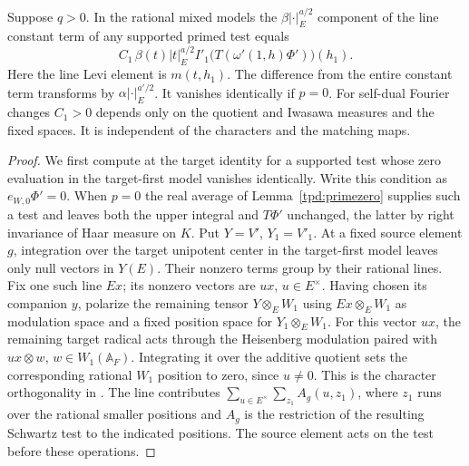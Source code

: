 \begin{proposition}
\label{tpd:unfold}
Suppose \(q>0\). In the rational mixed models the
\(\beta|\cdot|_E^{a/2}\) component of the line constant term of
any supported primed test equals
\[
 C_1\,\beta(t)|t|_E^{a/2}
 I'_1\bigl(T(\omega'(1,h)\Phi')\bigr)(h_1).
\]
Here the line Levi element is \(m(t,h_1)\). The difference from
the entire constant term transforms by \(\alpha|\cdot|_E^{a'/2}\).
It vanishes identically if \(p=0\).
For self-dual Fourier changes \(C_1>0\) depends only on the quotient
and Iwasawa measures and the fixed spaces. It is independent of the
characters and the matching maps.
\end{proposition}
\begin{proof}
We first compute at the target identity for a supported test
whose zero evaluation in the target-first model vanishes identically.
Write this condition as \(e_{W,0}\Phi'=0\). When \(p=0\) the real
average of Lemma~\ref{tpd:primezero} supplies such a test and leaves
both the upper integral and \(T\Phi'\) unchanged, the latter by
right invariance of Haar measure on \(K\).
Put \(Y=V'\), \(Y_1=V'_1\). At a fixed
source element \(g\), integration over the target unipotent center
in the target-first model leaves only null vectors in \(Y(E)\).
Their nonzero terms group by their rational lines. Fix one such
line \(Ex\); its nonzero vectors are \(u x\), \(u\in E^\times\).
Having chosen its companion \(y\), polarize the remaining tensor
\(Y\otimes_EW_1\) using \(Ex\otimes_E W_1\) as modulation space
and a fixed position space for \(Y_1\otimes_EW_1\).
For this vector \(ux\), the remaining target radical acts through
the Heisenberg modulation paired with \(ux\otimes w\),
\(w\in W_1(\mathbb A_F)\). Integrating it over the additive quotient
sets the corresponding rational \(W_1\) position to zero, since
\(u\ne0\). This is the character orthogonality in
\cite[(3.15)--(3.20)]{wuThetaTower}. The line contributes
\(\sum_{u\in E^\times}\sum_{z_1} A_g(u,z_1)\), where \(z_1\)
runs over the rational smaller positions and \(A_g\) is the
restriction of the resulting Schwartz test to the indicated positions.
The source element acts on the test before these operations.


\end{proof}
